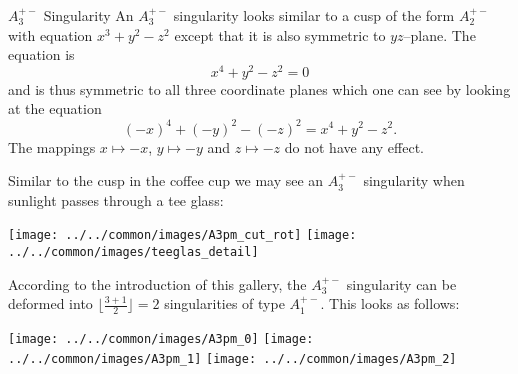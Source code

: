 \begin{surferPage}[A3+- Singularity]{$A_3^{+-}$ Singularity}
	An $A_3^{+-}$ singularity looks similar to a cusp of the form $A_2^{+-}$ with equation $x^3+y^2-z^2$ except that it is also symmetric to $yz$--plane. The equation is
	\[
		x^4+y^2-z^2=0
	\]
	and is thus symmetric to all three coordinate planes which one can see by looking at the equation
	\[
		(-x)^4+(-y)^2-(-z)^2=x^4+y^2-z^2.
	\]
	The mappings $x\mapsto -x$, $y\mapsto -y$ and $z\mapsto -z$ do not have any effect.

	Similar to the cusp in the coffee cup we may see an $A_3^{+-}$ singularity when sunlight passes through a tee glass:
	\begin{Centering*}%
		\texttt{[image: ../../common/images/A3pm\_cut\_rot]}\qquad%
		\texttt{[image: ../../common/images/teeglas\_detail]}%
	\end{Centering*}
	According to the introduction of this gallery, the $A_3^{+-}$ singularity can be deformed into $\lfloor\frac{3+1}{2}\rfloor=2$ singularities of type $A_1^{+-}\!$. This looks as follows:
	\begin{Centering*}%
		\texttt{[image: ../../common/images/A3pm\_0]}\quad%
		\texttt{[image: ../../common/images/A3pm\_1]}\quad%
		\texttt{[image: ../../common/images/A3pm\_2]}%
	\end{Centering*}
\end{surferPage}
